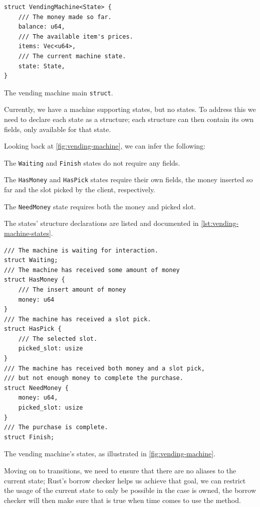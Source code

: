 \begin{listing}
    \begin{verbatim}
struct VendingMachine<State> {
    /// The money made so far.
    balance: u64,
    /// The available item's prices.
    items: Vec<u64>,
    /// The current machine state.
    state: State,
}
\end{verbatim}
    \caption{The vending machine main \texttt{struct}.}
    \label{lst:vending-machine-struct}
\end{listing}

Currently, we have a machine supporting states, but no states.
To address this we need to declare each state as a structure;
each structure can then contain its own fields, only available for that state.

Looking back at \autoref{fig:vending-machine}, we can infer the following:
\begin{compactitem}
    \item The \texttt{Waiting} and \texttt{Finish} states do not require any fields.
    \item The \texttt{HasMoney} and \texttt{HasPick} states require their own fields,
    the money inserted so far and the slot picked by the client, respectively.
    \item The \texttt{NeedMoney} state requires both the money and picked slot.
\end{compactitem}

The states' structure declarations are listed and documented in \autoref{lst:vending-machine-states}.

\begin{listing}
    \begin{verbatim}
/// The machine is waiting for interaction.
struct Waiting;
/// The machine has received some amount of money
struct HasMoney {
    /// The insert amount of money
    money: u64
}
/// The machine has received a slot pick.
struct HasPick {
    /// The selected slot.
    picked_slot: usize
}
/// The machine has received both money and a slot pick,
/// but not enough money to complete the purchase.
struct NeedMoney {
    money: u64,
    picked_slot: usize
}
/// The purchase is complete.
struct Finish;
\end{verbatim}
    \caption{The vending machine's states, as illustrated in \autoref{fig:vending-machine}.}
    \label{lst:vending-machine-states}
\end{listing}

Moving on to transitions, we need to ensure that there are no aliases to the current state;
Rust's borrow checker helps us achieve that goal,
we can restrict the usage of the current state to only be possible in the case  is owned,
the borrow checker will then make sure that is true when time comes to use the method.

